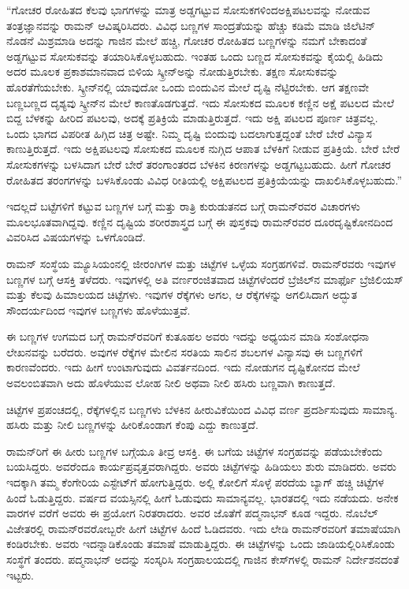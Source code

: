 \vskip 1pt

“ಗೋಚರ ರೋಹಿತದ ಕೆಲವು ಭಾಗಗಳನ್ನು ಮಾತ್ರ ಅಡ್ಡಗಟ್ಟುವ ಸೋಸುಕಗಳಿಂದ\break ಅಕ್ಷಿಪಟಲವನ್ನು ನೋಡುವ ತಂತ್ರಜ್ಞಾನವನ್ನು ರಾಮನ್ ಆವಿಷ್ಕರಿಸಿದರು. ವಿವಿಧ ಬಣ್ಣಗಳ ಸಾಂದ್ರತೆಯನ್ನು ಹೆಚ್ಚು ಕಡಿಮೆ ಮಾಡಿ ಜಿಲೆಟಿನ್ ನೊಡನೆ ಮಿಶ್ರಮಾಡಿ ಅದನ್ನು ಗಾಜಿನ ಮೇಲೆ ಹಚ್ಚಿ, ಗೋಚರ ರೋಹಿತದ ಬಣ್ಣಗಳನ್ನು ನಮಗೆ ಬೇಕಾದಂತೆ ಅಡ್ಡಗಟ್ಟುವ ಸೋಸುಕವನ್ನು ತಯಾರಿಸಿಕೊಳ್ಳಬಹುದು. ಇಂತಹ ಒಂದು ಬಣ್ಣದ ಸೋಸುಕವನ್ನು ಕೈಯಲ್ಲಿ ಹಿಡಿದು ಅದರ ಮೂಲಕ ಪ್ರಕಾಶಮಾನವಾದ ಬಿಳಿಯ ಸ್ಕ್ರೀನ್‍ಅನ್ನು ನೋಡುತ್ತಿರಬೇಕು. ತಕ್ಷಣ ಸೋಸುಕವನ್ನು ಹೊರತೆಗೆಯಬೇಕು. ಸ್ಕ್ರೀನ್‍ನಲ್ಲಿ ಯಾವುದೋ ಒಂದು ಬಿಂದುವಿನ ಮೇಲೆ ದೃಷ್ಟಿ ನೆಟ್ಟಿರಬೇಕು. ಆಗ ತಕ್ಷಣವೇ ಬಣ್ಣಬಣ್ಣದ ದೃಶ್ಯವು ಸ್ಕ್ರೀನ್‍ನ ಮೇಲೆ ಕಾಣತೊಡಗುತ್ತದೆ. ಇದು ಸೋಸುಕದ ಮೂಲಕ ಕಣ್ಣಿನ ಅಕ್ಷೆ ಪಟಲದ ಮೇಲೆ ಬಿದ್ದ ಬೆಳಕನ್ನು ಹೀರಿದ ಪಟಲವು, ಅದಕ್ಕೆ ಪ್ರತಿಕ್ರಿಯೆ ಮಾಡುತ್ತಿರುತ್ತದೆ. ಇದು ಅಕ್ಷಿ ಪಟಲದ ಪೂರ್ಣ ಚಿತ್ರವಲ್ಲ. ಒಂದು ಭಾಗದ ವಿಪರೀತ ಹಿಗ್ಗಿದ ಚಿತ್ರ ಅಷ್ಟೇ. ನಿಮ್ಮ ದೃಷ್ಟಿ ಬಿಂದುವು ಬದಲಾಗುತ್ತದ್ದಂತೆ ಬೇರೆ ಬೇರೆ ವಿನ್ಯಾಸ ಕಾಣುತ್ತಿರುತ್ತದೆ. ಇದು ಅಕ್ಷಿಪಟಲವು ಸೋಸುಕದ ಮೂಲಕ ನುಗ್ಗಿದ ಆಪಾತ ಬೆಳಕಿಗೆ ನೀಡುವ ಪ್ರತಿಕ್ರಿಯೆ. ಬೇರೆ ಬೇರೆ ಸೋಸುಕಗಳನ್ನು ಬಳಸಿದಾಗ ಬೇರೆ ಬೇರೆ ತರಂಗಾಂತರದ ಬೆಳಕಿನ ಕಿರಣಗಳನ್ನು ಅಡ್ಡಗಟ್ಟಬಹುದು. ಹೀಗೆ ಗೋಚರ ರೋಹಿತದ ತರಂಗಗಳನ್ನು ಬಳಸಿಕೊಂಡು ವಿವಿಧ ರೀತಿಯಲ್ಲಿ ಅಕ್ಷಿಪಟಲದ ಪ್ರತಿಕ್ರಿಯೆಯನ್ನು ದಾಖಲಿಸಿಕೊಳ್ಳಬಹುದು.”

\vskip 1pt

ಇದಲ್ಲದೆ ಬಟ್ಟೆಗಳಿಗೆ ಕಟ್ಟುವ ಬಣ್ಣಗಳ ಬಗ್ಗೆ ಮತ್ತು ರಾತ್ರಿ ಕುರುಡುತನದ ಬಗ್ಗೆ ರಾಮನ್‍ರವರ ವಿಚಾರಗಳು ಮೂಲಭೂತವಾಗಿದ್ದವು. ಕಣ್ಣಿನ ದೃಷ್ಟಿಯ ಶರೀರಶಾಸ್ತ್ರದ ಬಗ್ಗೆ ಈ ಪುಸ್ತಕವು ರಾಮನ್‍ರವರ ದೂರದೃಷ್ಟಿಕೋನದಿಂದ ವಿವರಿಸಿದ ವಿಷಯಗಳನ್ನು ಒಳಗೊಂಡಿದೆ.

\vskip 1pt


\vskip 1pt

ರಾಮನ್ ಸಂಸ್ಥೆಯ ಮ್ಯೂಸಿಯಂನಲ್ಲಿ ಜೀರಂಗಿಗಳ ಮತ್ತು ಚಿಟ್ಟೆಗಳ ಒಳ್ಳೆಯ ಸಂಗ್ರಹಗಳಿವೆ. ರಾಮನ್‍ರವರು ಇವುಗಳ ಬಣ್ಣಗಳ ಬಗ್ಗೆ ಆಸಕ್ತಿ ತಳೆದರು. ಇವುಗಳಲ್ಲಿ ಅತಿ ವರ್ಣರಂಜಿತವಾದ ಚಿಟ್ಟೆಗಳೆಂದರೆ ಬ್ರೆಜಿಲ್‍ನ ಮಾರ್ಫೊ ಬ್ರೆಜಿಲಿಯಸ್ ಮತ್ತು ಕೆಲವು ಹಿಮಾಲಯದ ಚಿಟ್ಟೆಗಳು. ಇವುಗಳ ರೆಕ್ಕೆಗಳು ಅಗಲ, ಆ ರೆಕ್ಕೆಗಳನ್ನು ಅಗಲಿಸಿದಾಗ ಅದ್ಭುತ ಸೌಂದರ್ಯದಿಂದ ಇವುಗಳ ಬಣ್ಣಗಳು ಹೊಳೆಯುತ್ತವೆ.

ಈ ಬಣ್ಣಗಳ ಉಗಮದ ಬಗ್ಗೆ ರಾಮನ್‍ರವರಿಗೆ ಕುತೂಹಲ ಅವರು ಇದನ್ನು ಅಧ್ಯಯನ ಮಾಡಿ ಸಂಶೋಧನಾ ಲೇಖನವನ್ನು ಬರೆದರು. ಅವುಗಳ ರೆಕ್ಕೆಗಳ ಮೇಲಿನ ಸರತಿಯ ಸಾಲಿನ ಶಬಲಗಳ ವಿನ್ಯಾಸವು ಈ ಬಣ್ಣಗಳಿಗೆ ಕಾರಣವೆಂದರು. ಇದು ಹೀಗೆ ಉಂಟಾಗುವುದು ವಿವರ್ತನದಿಂದ. ಇದು ನೋಡುಗನ ದೃಷ್ಟಿಕೋನದ ಮೇಲೆ ಅವಲಂಬಿತವಾಗಿ ಅದು ಹೊಳೆಯುವ ಲೋಹ ನೀಲಿ ಅಥವಾ ನೀಲಿ ಹಸಿರು ಬಣ್ಣವಾಗಿ ಕಾಣುತ್ತದೆ.

\newpage

ಚಿಟ್ಟೆಗಳ ಪ್ರಪಂಚದಲ್ಲಿ, ರೆಕ್ಕೆಗಳಲ್ಲಿನ ಬಣ್ಣಗಳು ಬೆಳಕಿನ ಹೀರುವಿಕೆಯಿಂದ ವಿವಿಧ ವರ್ಣ ಪ್ರದರ್ಶಿಸುವುದು ಸಾಮಾನ್ಯ. ಹಸಿರು ಮತ್ತು ನೀಲಿ ಬಣ್ಣಗಳನ್ನು ಹೀರಿಕೊಂಡಾಗ ಕೆಂಪು ಎದ್ದು ಕಾಣುತ್ತದೆ.

ರಾಮನ್‍ರಿಗೆ ಈ ಹೀರು ಬಣ್ಣಗಳ ಬಗ್ಗೆಯೂ ತೀವ್ರ ಆಸಕ್ತಿ. ಈ ಬಗೆಯ ಚಿಟ್ಟೆಗಳ ಸಂಗ್ರಹವನ್ನು ಪಡೆಯಬೇಕೆಂದು ಬಯಸಿದ್ದರು. ಅವರೆಂದೂ ಕಾರ್ಯಪ್ರವೃತ್ತವರಾಗಿದ್ದರು. ಅವರು ಚಿಟ್ಟೆಗಳನ್ನು ಹಿಡಿಯಲು ಶುರು ಮಾಡಿದರು. ಅವರು ಇದಕ್ಕಾಗಿ ತಮ್ಮ ಕೆಂಗೇರಿಯ ಎಸ್ಟೇಟ್‍ಗೆ ಹೋಗುತ್ತಿದ್ದರು. ಅಲ್ಲಿ ಕೋಲಿಗೆ ಸೊಳ್ಳೆ ಪರದೆಯ ಬ್ಯಾಗ್ ಹಚ್ಚಿ ಚಿಟ್ಟೆಗಳ ಹಿಂದೆ ಓಡುತ್ತಿದ್ದರು.  ವರ್ಷದ ವಯಸ್ಸಿನಲ್ಲಿ ಹೀಗೆ ಓಡುವುದು ಸಾಮಾನ್ಯವಲ್ಲ. ಭಾರತದಲ್ಲಿ ಇದು ನಡೆಯದು. ಅನೇಕ ವಾರಗಳ ವರೆಗೆ ಅವರು ಈ ಪ್ರಯೋಗ ನಿರತರಾದರು. ಅವರ ಜೊತೆಗೆ ಪದ್ಮನಾಭನ್ ಕೂಡ ಇದ್ದರು. ನೊಬೆಲ್ ವಿಜೇತರಲ್ಲಿ ರಾಮನ್‍ರವರೋಬ್ಬರೇ ಹೀಗೆ ಚಿಟ್ಟೆಗಳ ಹಿಂದೆ ಓಡಿದವರು. ಇದು ಲೇಡಿ ರಾಮನ್‍ರವರಿಗೆ ತಮಾಷೆಯಾಗಿ ಕಂಡಿರಬೇಕು. ಅವರು ಇದನ್ನಾಡಿಕೊಂಡು ತಮಾಷೆ ಮಾಡುತ್ತಿದ್ದರು. ಈ ಚಿಟ್ಟೆಗಳನ್ನು ಒಂದು ಜಾಡಿಯಲ್ಲಿರಿಸಿಕೊಂಡು ಸಂಸ್ಥೆಗೆ ತಂದರು. ಪದ್ಮನಾಭನ್ ಅದನ್ನು ಸಂಸ್ಕರಿಸಿ ಸಂಗ್ರಹಾಲಯದಲ್ಲಿ ಗಾಜಿನ ಕೇಸ್‍ಗಳಲ್ಲಿ ರಾಮನ್ ನಿರ್ದೇಶನದಂತೆ ಇಟ್ಟರು.


